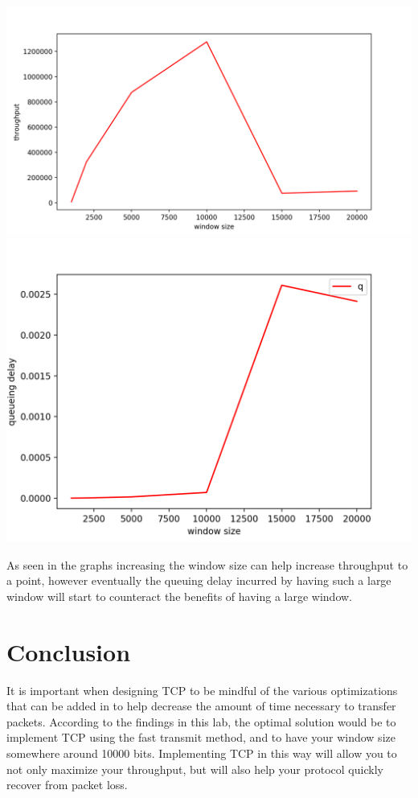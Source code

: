 \documentclass[a4paper,11pt]{article}
\begin{document}
\begin{center}
\includegraphics[width=\linewidth]{Throughput}
\includegraphics[width=\linewidth]{qd}
\end{center}

As seen in the graphs increasing the window size can help increase throughput to a point, however eventually the queuing delay incurred by having such a large window will start to counteract the benefits of having a large window. 

\section*{Conclusion}
It is important when designing TCP to be mindful of the various optimizations that can be added in to help decrease the amount of time necessary to transfer packets. According to the findings in this lab, the optimal solution would be to implement TCP using the fast transmit method, and to have your window size somewhere around 10000 bits. Implementing TCP in this way will allow you to not only maximize your throughput, but will also help your protocol quickly recover from packet loss.
\end{document}
